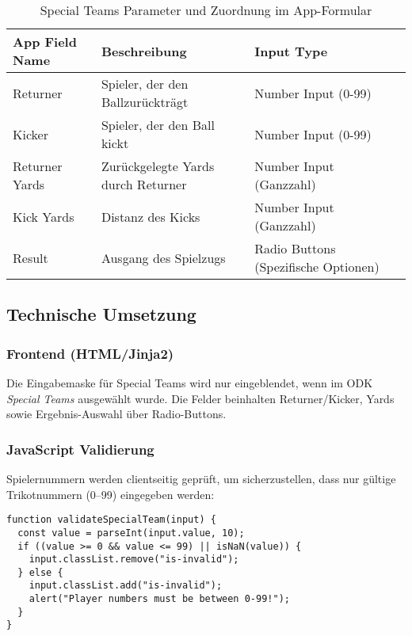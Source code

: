 \documentclass[12pt]{article}
\begin{document}
\begin{table}[H]
\centering
\begin{tabular}{|l|l|p{6cm}|l|}
\hline
\textbf{App Field Name} & \textbf{Beschreibung} & \textbf{Input Type} \\
\hline
 Returner       & Spieler, der den
Ballzurückträgt &
Number Input (0-99) \\
 Kicker         & Spieler, der den Ball kickt & Number Input (0-99) \\
Returner Yards & Zurückgelegte Yards durch Returner & Number Input (Ganzzahl) \\
 Kick Yards     & Distanz des Kicks & Number Input (Ganzzahl) \\
 Result         & Ausgang des Spielzugs & Radio Buttons (Spezifische Optionen) \\
\hline
\end{tabular}
\caption{Special Teams Parameter und Zuordnung im App-Formular}
\end{table}

\subsection{Technische Umsetzung}

\subsubsection{Frontend (HTML/Jinja2)}

Die Eingabemaske für Special Teams wird nur eingeblendet, wenn im ODK \textit{Special Teams} ausgewählt wurde. Die Felder beinhalten Returner/Kicker, Yards sowie Ergebnis-Auswahl über Radio-Buttons.

\subsubsection{JavaScript Validierung}

Spielernummern werden clientseitig geprüft, um sicherzustellen, dass nur gültige Trikotnummern (0–99) eingegeben werden:

\begin{verbatim}
function validateSpecialTeam(input) {
  const value = parseInt(input.value, 10);
  if ((value >= 0 && value <= 99) || isNaN(value)) {
    input.classList.remove("is-invalid");
  } else {
    input.classList.add("is-invalid");
    alert("Player numbers must be between 0-99!");
  }
}
\end{verbatim}
\end{document}

